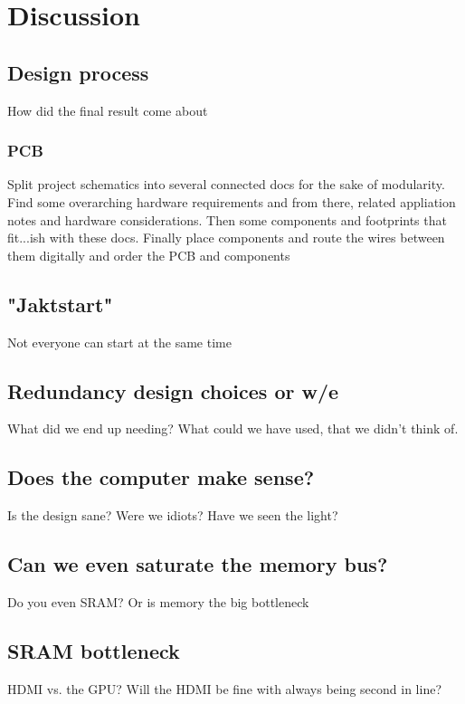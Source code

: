 \chapter{Discussion}

\section{Design process}
How did the final result come about
\subsection{PCB}
Split project schematics into several connected docs for the sake of modularity. Find some overarching hardware requirements and from there, related appliation notes and hardware considerations. Then some components and footprints that fit...ish with these docs.
Finally place components and route the wires between them digitally and order the PCB and components

\section{"Jaktstart"}

Not everyone can start at the same time

\section{Redundancy design choices or w/e}
What did we end up needing?
What could we have used, that we didn't think of.

\section{Does the computer make sense?}
Is the design sane?
Were we idiots?
Have we seen the light?

\section{Can we even saturate the memory bus?}
Do you even SRAM?
Or is memory the big bottleneck

\section{SRAM bottleneck}
HDMI vs. the GPU?
Will the HDMI be fine with always being second in line?


